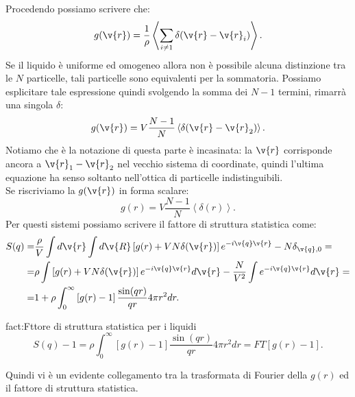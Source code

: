 Procedendo possiamo scrivere che:
\[
    g(\v{r}) = \frac{1}{\rho}\left<\sum_{i\neq 1}^{} \delta (\v{r}-\v{r}_i) \right>
.\] 
Se il liquido è uniforme ed omogeneo allora non è possibile alcuna distinzione tra le $N$ particelle, tali particelle sono equivalenti per la sommatoria. Possiamo esplicitare tale espressione quindi svolgendo la somma dei $N-1$ termini, rimarrà una singola $\delta$:
\[
    g(\v{r}) = V \frac{N-1}{N}\left<\delta (\v{r}-\v{r}_2) \right> 
.\] 
Notiamo che è la notazione di questa parte è incasinata: la $\v{r}$ corrisponde ancora a $\v{r}_1-\v{r}_2$ nel vecchio sistema di coordinate, quindi l'ultima equazione ha senso soltanto nell'ottica di particelle indistinguibili.\\
Se riscriviamo la $g(\v{r})$ in forma scalare:
\[
    g(r) = V \frac{N-1}{N}\left<\delta (r) \right> 
.\] 
Per questi sistemi possiamo scrivere il fattore di struttura statistica come:
\[\begin{aligned}
	S(q) =&
	\frac{\rho }{V} \int d \v{r} \int d\v{R} \left[ g(r) + VN\delta(\v{r}) \right] e^{-i \v{q}\v{r}} - N \delta_{\v{q},0}=\\
	=&
	\rho  \int \left[ g(r) + VN\delta(\v{r}) \right] e^{-i \v{q}\v{r}}d \v{r} - \frac{N}{V^2} \int e^{-i \v{q}\v{r}}d \v{r}=\\
	=&
	1 + \rho \int_{0}^{\infty} \left[ g(r) - 1 \right] \frac{\sin(qr)}{qr}4\pi r^2 dr 
.\end{aligned}\]
\begin{fact}{fact:Fttore di struttura statistica per i liquidi}
	\[
		S(q) - 1 = 
		\rho \int_{0}^{\infty} \left[ g(r) - 1 \right] \frac{\sin(qr)}{qr}4\pi r^2 dr 
		=
		FT\left[ g(r) - 1 \right] 
	.\] 
\end{fact}
Quindi vi è un evidente collegamento tra la trasformata di Fourier della $g(r)$ ed il fattore di struttura statistica.
